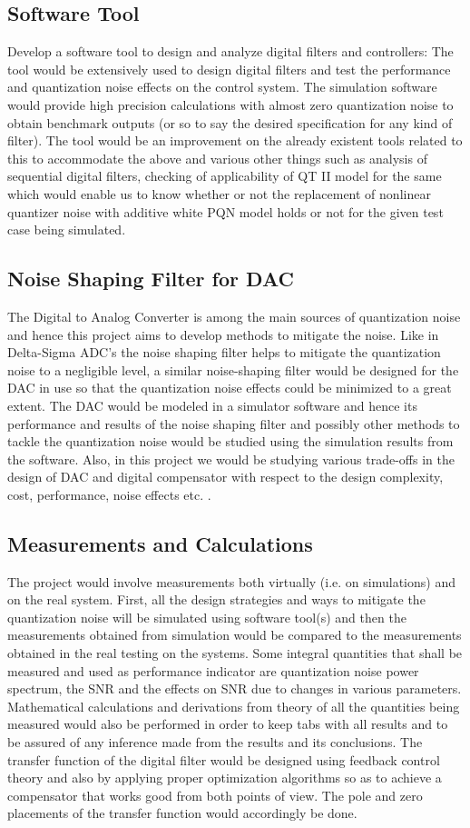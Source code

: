 \documentclass[colorlinks=true,pdfstartview=FitV,linkcolor=blue,
            citecolor=red,urlcolor=magenta]{ligodoc}
\begin{document}
\subsection{Software Tool}
Develop a software tool to design and analyze digital filters and controllers: The tool would be extensively used to design digital filters and test the performance and quantization noise effects on the control system. The simulation software would provide high precision calculations with almost zero quantization noise to obtain benchmark outputs (or so to say the desired specification for any kind of filter). The tool would be an improvement on the already existent tools related to this to accommodate the above and various other things such as analysis of sequential digital filters, checking of applicability of QT II model for the same which would enable us to know whether or not the replacement of nonlinear quantizer noise with additive  white PQN model holds or not for the given test case being simulated.
\subsection{Noise Shaping Filter for DAC}
The Digital to Analog Converter is among the main sources of quantization noise and hence this project aims to develop methods to mitigate the noise. Like in Delta-Sigma ADC’s the noise shaping filter helps to mitigate the quantization noise to a negligible level, a similar noise-shaping filter would be designed for the DAC in use so that the quantization noise effects could be minimized to a great extent. The DAC would be modeled in a simulator software and hence its performance and results of the noise shaping filter and possibly other methods to tackle the quantization noise would be studied using the simulation results from the software.  Also, in this project we would be studying various trade-offs in the design of DAC and digital compensator with respect to the design complexity, cost, performance, noise effects etc. . 
\subsection{Measurements and Calculations}
The project would involve measurements both virtually (i.e. on simulations) and on the real system. First, all the design strategies and ways to mitigate the quantization noise will be simulated using software tool(s) and then the measurements obtained from simulation would be compared to the measurements obtained in the real testing on the systems. Some integral quantities that shall be measured and used as performance indicator are quantization noise power spectrum, the SNR and the effects on SNR due to changes in various parameters. 
Mathematical calculations and derivations from theory of all the quantities being measured would also be performed in order to keep tabs with all results and to be assured of any inference made from the results and its conclusions. 
The transfer function of the digital filter would be designed using feedback control theory and also by applying proper optimization algorithms so as to achieve a compensator that works good from both points of view. The pole and zero placements of the transfer function would accordingly be done.  
\end{document}
